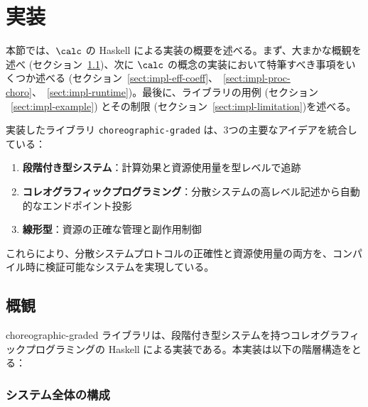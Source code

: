 \section{実装}

本節では、$\calc$ の Haskell による実装の概要を述べる。まず、大まかな概観を述べ (セクション~\ref{sect:impl-concept})、次に $\calc$ の概念の実装において特筆すべき事項をいくつか述べる (セクション~\ref{sect:impl-eff-coeff}、~\ref{sect:impl-proc-choro}、~\ref{sect:impl-runtime})。最後に、ライブラリの用例 (セクション ~\ref{sect:impl-example}) とその制限 (セクション~\ref{sect:impl-limitation})を述べる。

実装したライブラリ \texttt{choreographic-graded} は、3つの主要なアイデアを統合している：
\begin{enumerate}
\item \textbf{段階付き型システム}：計算効果と資源使用量を型レベルで追跡
\item \textbf{コレオグラフィックプログラミング}：分散システムの高レベル記述から自動的なエンドポイント投影
\item \textbf{線形型}：資源の正確な管理と副作用制御
\end{enumerate}

これらにより、分散システムプロトコルの正確性と資源使用量の両方を、コンパイル時に検証可能なシステムを実現している。

\subsection{概観}
\label{sect:impl-concept}

choreographic-graded ライブラリは、段階付き型システムを持つコレオグラフィックプログラミングの Haskell による実装である。本実装は以下の階層構造をとる：

\subsubsection{システム全体の構成}

